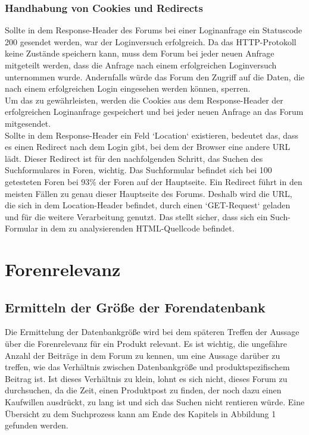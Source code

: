 \subsubsection{Handhabung von Cookies und Redirects}
Sollte in dem Response-Header des Forums bei einer Loginanfrage ein Statuscode 200 gesendet werden, war der Loginversuch erfolgreich. Da das HTTP-Protokoll keine Zustände speichern kann, muss dem Forum bei jeder neuen Anfrage mitgeteilt werden, dass die Anfrage nach einem erfolgreichen Loginversuch unternommen wurde. Andernfalls würde das Forum den Zugriff auf die Daten, die nach einem erfolgreichen Login eingesehen werden können, sperren.\\
Um das zu gewährleisten, werden die Cookies aus dem Response-Header der erfolgreichen Loginanfrage gespeichert und bei jeder neuen Anfrage an das Forum mitgesendet.\\
Sollte in dem Response-Header ein Feld `Location` existieren, bedeutet das, dass es einen Redirect nach dem Login gibt, bei dem der Browser eine andere URL lädt. Dieser Redirect ist für den nachfolgenden Schritt, das Suchen des Suchformulares in Foren, wichtig. Das Suchformular befindet sich bei 100 getesteten Foren bei 93\% der Foren auf der Hauptseite. Ein Redirect führt in den meisten Fällen zu genau dieser Hauptseite des Forums. Deshalb wird die URL, die sich in dem Location-Header befindet, durch einen `GET-Request` geladen und für die weitere Verarbeitung genutzt. Das stellt sicher, dass sich ein Such-Formular in dem zu analysierenden HTML-Quellcode befindet.

\section{Forenrelevanz}
\subsection{Ermitteln der Größe der Forendatenbank}
Die Ermittelung der Datenbankgröße wird bei dem späteren Treffen der Aussage über die Forenrelevanz für ein Produkt relevant.
Es ist wichtig, die ungefähre Anzahl der Beiträge in dem Forum zu kennen, um eine Aussage darüber zu treffen, wie das Verhältnis zwischen Datenbankgröße und produktspezifischem Beitrag ist. Ist dieses Verhältnis zu klein, lohnt es sich nicht, dieses Forum zu durchsuchen, da die Zeit, einen Produktpost zu finden, der noch dazu einen Kaufwillen ausdrückt, zu lang ist und sich das Suchen nicht rentieren würde.
Eine Übersicht zu dem Suchprozess kann am Ende des Kapitels in Abbildung 1 gefunden werden.	

